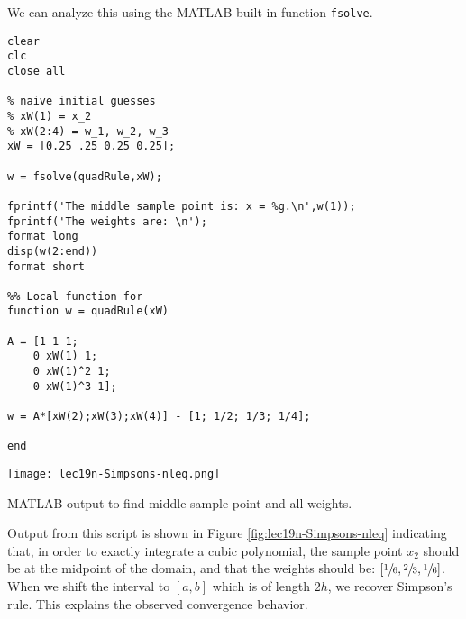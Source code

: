 We can analyze this using the MATLAB built-in function \lstinline[style=myMatlab]{fsolve}.

\begin{lstlisting}[style=myMatlab,name=lec19n-nq]
clear
clc
close all

% naive initial guesses
% xW(1) = x_2
% xW(2:4) = w_1, w_2, w_3
xW = [0.25 .25 0.25 0.25];

w = fsolve(quadRule,xW);

fprintf('The middle sample point is: x = %g.\n',w(1));
fprintf('The weights are: \n');
format long
disp(w(2:end))
format short

%% Local function for 
function w = quadRule(xW)

A = [1 1 1;
    0 xW(1) 1;
    0 xW(1)^2 1;
    0 xW(1)^3 1];

w = A*[xW(2);xW(3);xW(4)] - [1; 1/2; 1/3; 1/4];

end
\end{lstlisting}

\begin{marginfigure}
\texttt{[image: lec19n-Simpsons-nleq.png]}
\caption{MATLAB output to find middle sample point and all weights.}
\label{fig:lec19n-Simpsons-nleq}
\end{marginfigure}

Output from this script is shown in Figure \ref{fig:lec19n-Simpsons-nleq} indicating that, in order to exactly integrate a cubic polynomial, the sample point $x_2$ should be at the midpoint of the domain, and that the weights should be: $[\sfrac{1}{6}, \sfrac{2}{3}, \sfrac{1}{6}]$.  When we shift the interval to $[a,b]$ which is of length $2h$, we recover Simpson's rule.  This explains the observed convergence behavior.

